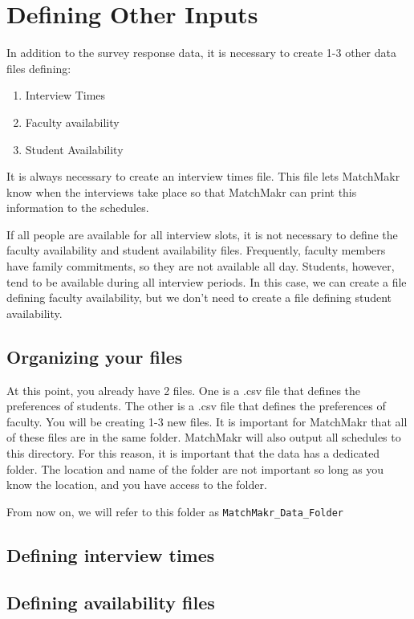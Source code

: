 \chapter{Defining Other Inputs}

In addition to the survey response data, it is necessary to create 1-3 other data files defining:
\begin{enumerate}
	\item Interview Times
	\item Faculty availability
	\item Student Availability
\end{enumerate}

It is always necessary to create an interview times file.  This file lets MatchMakr know when the interviews take place so that MatchMakr can print this information to the schedules.

If all people are available for all interview slots, it is not necessary to define the faculty availability and student availability files.  Frequently, faculty members have family commitments, so they are not available all day.  Students, however, tend to be available during all interview periods.  In this case, we can create a file defining faculty availability, but we don't need to create a file defining student availability.



%
%
\section{Organizing your files}
At this point, you already have 2 files.  One is a .csv file that defines the preferences of students.  The other is a .csv file that defines the preferences of faculty.  You will be creating 1-3 new files.  It is important for MatchMakr that all of these files are in the same folder.  MatchMakr will also output all schedules to this directory.  For this reason, it is important that the data has a dedicated folder.  The location and name of the folder are not important so long as you know the location, and you have access to the folder.

From now on, we will refer to this folder as \texttt{MatchMakr\_Data\_Folder}

%
%
\section{Defining interview times}



%
%
\section{Defining availability files}